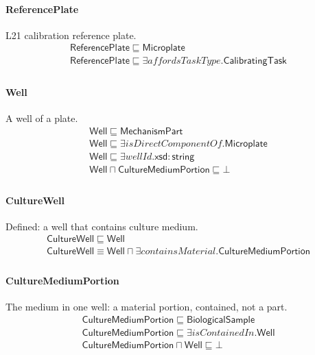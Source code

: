 \documentclass[10pt]{article}
\begin{document}
\paragraph{ReferencePlate} L21 calibration reference plate.
\[\begin{array}{l}
\mathsf{ReferencePlate} \sqsubseteq  \mathsf{Microplate} \\
\mathsf{ReferencePlate} \sqsubseteq  \exists \mathit{affordsTaskType}.\mathsf{CalibratingTask} \\
\end{array}\]
\paragraph{Well} A well of a plate.
\[\begin{array}{l}
\mathsf{Well} \sqsubseteq  \mathsf{MechanismPart} \\
\mathsf{Well} \sqsubseteq  \exists \mathit{isDirectComponentOf}.\mathsf{Microplate} \\
\mathsf{Well} \sqsubseteq  \exists \mathit{wellId}.\mathsf{xsd{:}string} \\
\mathsf{Well} \sqcap  \mathsf{CultureMediumPortion} \sqsubseteq  \bot  \\
\end{array}\]
\paragraph{CultureWell} Defined: a well that contains culture medium.
\[\begin{array}{l}
\mathsf{CultureWell} \sqsubseteq  \mathsf{Well} \\
\mathsf{CultureWell} \equiv  \mathsf{Well} \sqcap  \exists \mathit{containsMaterial}.\mathsf{CultureMediumPortion} \\
\end{array}\]
\paragraph{CultureMediumPortion} The medium in one well: a material portion, contained, not a part.
\[\begin{array}{l}
\mathsf{CultureMediumPortion} \sqsubseteq  \mathsf{BiologicalSample} \\
\mathsf{CultureMediumPortion} \sqsubseteq  \exists \mathit{isContainedIn}.\mathsf{Well} \\
\mathsf{CultureMediumPortion} \sqcap  \mathsf{Well} \sqsubseteq  \bot  \\
\end{array}\]
\end{document}
